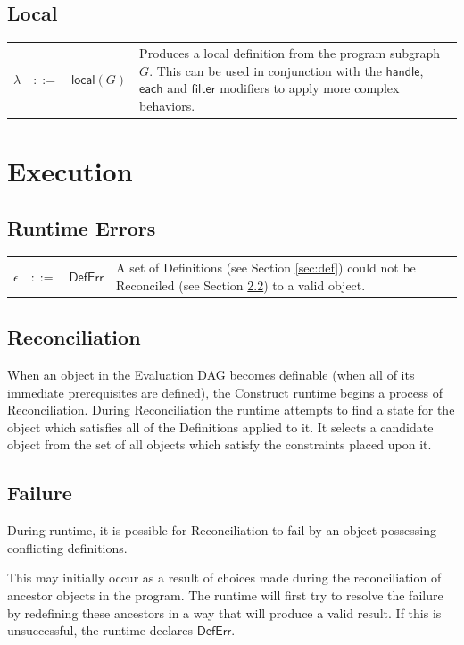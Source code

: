 \documentclass[twoside,11pt]{report}
\begin{document}
\section{Local}
\label{sec:local}
\begin{tabularx}{\textwidth}{l l l X}
$\lambda$ & $::=$ & $\mathsf{local}(G)$ & Produces a local definition from the program subgraph $G$. This can be used in conjunction with the $\mathsf{handle}$, $\mathsf{each}$ and $\mathsf{filter}$ modifiers to apply more complex behaviors.\\
\end{tabularx}


\chapter{Execution}
\label{chap:exec}

\section{Runtime Errors}
\label{sec:runtime-errors}

\begin{tabularx}{\textwidth}{l l l X}
$\epsilon$ & $::=$ & $\mathsf{DefErr}$ & A set of Definitions (see Section \ref{sec:def}) could not be Reconciled (see Section \ref{sec:reconc}) to a valid object.
\end{tabularx}

\section{Reconciliation}
\label{sec:reconc}

When an object in the Evaluation DAG becomes definable (when all of its immediate prerequisites are defined), the Construct runtime begins a process of Reconciliation. 
During Reconciliation the runtime attempts to find a state for the object which satisfies all of the Definitions applied to it. 
It selects a candidate object from the set of all objects which satisfy the constraints placed upon it.

\section{Failure}
\label{sec:failure}

During runtime, it is possible for Reconciliation to fail by an object possessing conflicting definitions. 

This may initially occur as a result of choices made during the reconciliation of ancestor objects in the program. 
The runtime will first try to resolve the failure by redefining these ancestors in a way that will produce a valid result. 
If this is unsuccessful, the runtime declares $\mathsf{DefErr}$.
\end{document}
